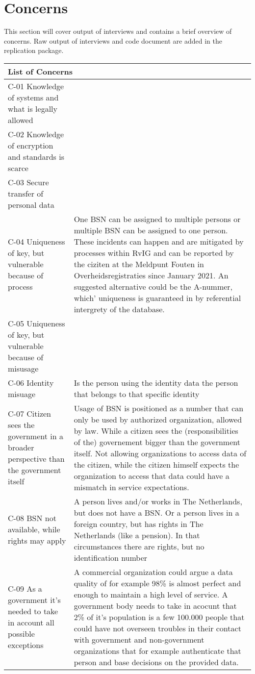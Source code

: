 \section*{Concerns}
This section will cover output of interviews and contains a brief overview of concerns. Raw output of interviews and code document are added in the replication package.
\\
\begin{tabular}{ |p{5cm}||p{11cm}|}
 \hline
 \multicolumn{2}{|l|}{List of Concerns} \\
 \hline
 C-01 Knowledge of systems and what is legally allowed    &        \\
 \hline
 C-02 Knowledge of encryption and standards is scarce &   \\
  \hline
 C-03 Secure transfer of personal data  &   \\
  \hline
C-04 Uniqueness of key, but vulnerable because of process
& One BSN can be assigned to multiple persons or multiple BSN can be assigned to one person. These incidents can happen and are mitigated by processes within RvIG and can be reported by the ciziten at the Meldpunt Fouten in Overheidsregistraties since January 2021. An suggested alternative could be the A-nummer, which' uniqueness is guaranteed in by referential intergrety of the database.
  \\
\hline
C-05 Uniqueness of key, but vulnerable because of misusage & \\
\hline
C-06 Identity misuage & Is the person using the identity data the person that belongs to that specific identity\\
\hline
C-07 Citizen sees the government in a broader perspective than the government itself & Usage of BSN is positioned as a number that can only be used by authorized organization, allowed by law. While a citizen sees the (responsibilities of the) governement bigger than the government itself. Not allowing organizations to access data of the citizen, while the citizen himself expects the organization to access that data could have a mismatch in service expectations.\\
\hline
C-08 BSN not available, while rights may apply & A person lives and/or works in The Netherlands, but does not have a BSN. Or a person lives in a foreign country, but has rights in The Netherlands (like a pension). In that circumstances there are rights, but no identification number\\
\hline
C-09 As a government it’s needed to take in account all possible exceptions & A commercial organization could argue a data quality of for example 98\% is almost perfect and enough to maintain a high level of service. A government body needs to take in acocunt that 2\% of it's population is a few 100.000 people that could have not overseen troubles in their contact with government and non-government organizations that for example authenticate that person and base decisions on the provided data. \\

\end{tabular}
